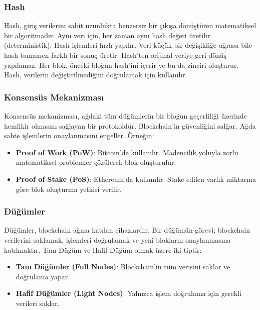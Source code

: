 \subsubsection{Hash}

Hash, giriş verilerini sabit uzunlukta benzersiz bir çıkışa dönüştüren matematiksel bir algoritmadır. Aynı veri için, her zaman aynı hash değeri üretilir (deterministik). Hash işlemleri hızlı yapılır. Veri küçük bir değişikliğe uğrasa bile hash tamamen farklı bir sonuç üretir. Hash'ten orijinal veriye geri dönüş yapılamaz. Her blok, önceki bloğun hash’ini içerir ve bu da zinciri oluşturur. Hash, verilerin değiştirilmediğini doğrulamak için kullanılır.

\subsubsection{Konsensüs Mekanizması}

Konsensüs mekanizması, ağdaki tüm düğümlerin bir bloğun geçerliliği üzerinde hemfikir olmasını sağlayan bir protokoldür. Blockchain'in güvenliğini salğar. Ağda sahte işlemlerin onaylanmasını engeller. Örneğin:

\begin{itemize}
    \item \textbf{Proof of Work (PoW)}: Bitcoin'de kullanılır. Madencilik yoluyla zorlu matematiksel problemler çözülerek blok oluşturulur.
    \item \textbf{Proof of Stake (PoS)}: Ethereum'da kullanılır. Stake edilen varlık miktarına göre blok oluşturma yetkisi verilir.
\end{itemize}

\subsubsection{Düğümler}

Düğümler, blockchain ağına katılan cihazlardır. Bir düğümün görevi; blockchain verilerini saklamak, işlemleri doğrulamak ve yeni blokların onaylanmasına katılmaktır. Tam Düğüm ve Hafif Düğüm olmak üzere iki tiptir:

\begin{itemize}
    \item \textbf{Tam Düğümler (Full Nodes)}: Blockchain'in tüm verisini saklar ve doğrulama yapar.
    \item \textbf{Hafif Düğümler (Light Nodes)}: Yalnızca işlem doğrulama için gerekli verileri saklar.
\end{itemize}

